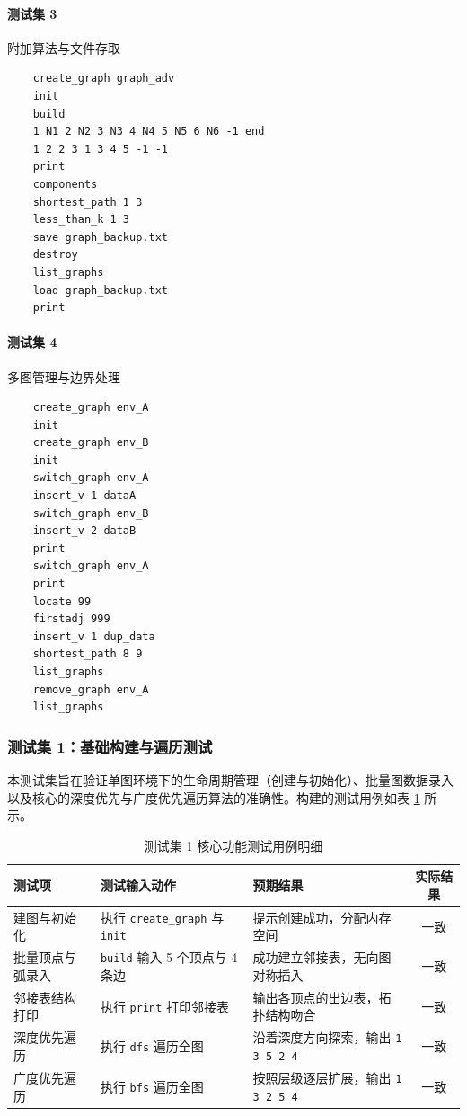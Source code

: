 \documentclass[supercite]{Experimental_Report}
\theoremstyle{definition}
\begin{document}
\paragraph{测试集 3} 附加算法与文件存取
\begin{lstlisting}
	create_graph graph_adv
	init
	build
	1 N1 2 N2 3 N3 4 N4 5 N5 6 N6 -1 end
	1 2 2 3 1 3 4 5 -1 -1
	print
	components
	shortest_path 1 3
	less_than_k 1 3
	save graph_backup.txt
	destroy
	list_graphs
	load graph_backup.txt
	print
\end{lstlisting}

\paragraph{测试集 4} 多图管理与边界处理
\begin{lstlisting}
	create_graph env_A
	init
	create_graph env_B
	init
	switch_graph env_A
	insert_v 1 dataA
	switch_graph env_B
	insert_v 2 dataB
	print
	switch_graph env_A
	print
	locate 99
	firstadj 999
	insert_v 1 dup_data
	shortest_path 8 9
	list_graphs
	remove_graph env_A
	list_graphs
\end{lstlisting}

\subsubsection{测试集 1：基础构建与遍历测试}

本测试集旨在验证单图环境下的生命周期管理（创建与初始化）、批量图数据录入以及核心的深度优先与广度优先遍历算法的准确性。构建的测试用例如表 \ref{tab:graph_test_suite_1} 所示。

\begin{table}[htbp]
	\centering
	\caption{测试集 1 核心功能测试用例明细}
	\vspace{0.5em}
	\begin{tabular}{|>{\centering\arraybackslash}p{3cm}|>{\centering\arraybackslash}p{3.5cm}|>{\centering\arraybackslash}p{4.5cm}|c|}
		\hline
		\textbf{测试项} & \textbf{测试输入动作} & \textbf{预期结果} & \textbf{实际结果} \\ \hline
		建图与初始化 & 执行 \texttt{create\_graph} 与 \texttt{init} & 提示创建成功，分配内存空间 & 一致 \\ \hline
		批量顶点与弧录入 & \texttt{build} 输入 5 个顶点与 4 条边 & 成功建立邻接表，无向图对称插入 & 一致 \\ \hline
		邻接表结构打印 & 执行 \texttt{print} 打印邻接表 & 输出各顶点的出边表，拓扑结构吻合 & 一致 \\ \hline
		深度优先遍历 & 执行 \texttt{dfs} 遍历全图 & 沿着深度方向探索，输出 \texttt{1 3 5 2 4} & 一致 \\ \hline
		广度优先遍历 & 执行 \texttt{bfs} 遍历全图 & 按照层级逐层扩展，输出 \texttt{1 3 2 5 4} & 一致 \\ \hline
	\end{tabular}
	\label{tab:graph_test_suite_1}
\end{table}
\end{document}
